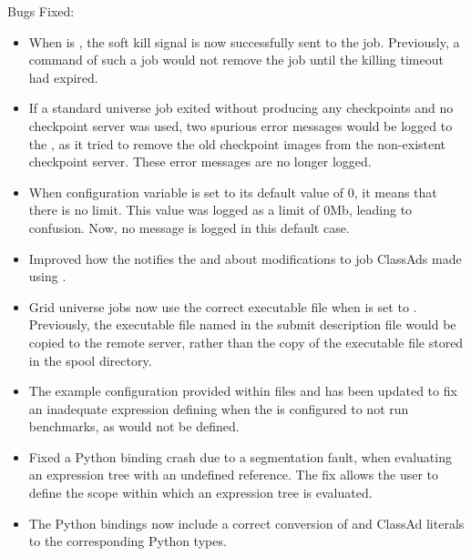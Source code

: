 \noindent Bugs Fixed:

\begin{itemize}

\item When  is , 
the soft kill signal is now successfully sent to the job.
Previously, a 
command of such a job would not remove the job until the
killing timeout had expired.

\item If a standard universe job exited without producing any
checkpoints and no checkpoint server was used, 
two spurious error messages would be logged to the ,
as it tried to remove the old checkpoint images from the
non-existent checkpoint server.  
These error messages are no longer logged.

\item When configuration variable  is set 
to its default value of 0, it means that there is no limit.  
This value was logged as a limit of 0Mb, leading to confusion.
Now, no message is logged in this default case.

\item Improved how the  notifies the 
and  about modifications to job ClassAds made using
.

\item Grid universe jobs now use the correct executable file when
 is set to .
Previously, the executable file named in the submit description file 
would be copied to the remote server, 
rather than the copy of the executable file stored in the spool directory.

\item The example configuration provided within files 
 and  
has been updated to fix an inadequate expression defining 
 when the  is 
configured to not run benchmarks, as  would not be defined.

\item Fixed a Python binding crash due to a segmentation fault,
when evaluating an expression tree with an undefined reference.
The fix allows the user to define the  scope 
within which an expression tree is evaluated.

\item The Python bindings now include a correct conversion of
 and  ClassAd literals to the 
corresponding Python types.

\end{itemize}


